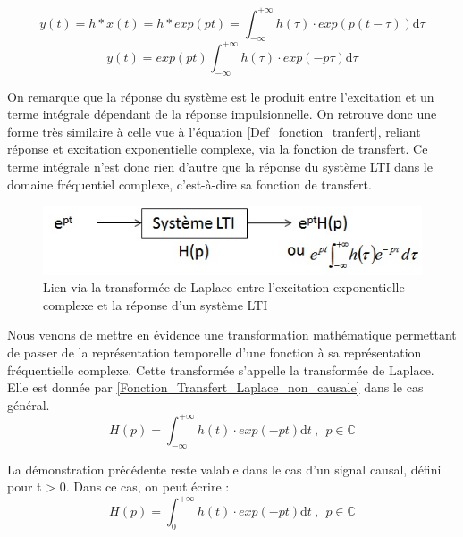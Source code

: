 \documentclass[]{report}
\newcommand{\deriv}{\mathrm{d}}
\begin{document}
	\begin{equation}\label{}
	y(t) = h*x(t) = h * exp(pt) = \int_{-\infty}^{+\infty} h(\tau) \cdot exp(p(t-\tau))
 \deriv \tau 	
 	\end{equation}
	\begin{equation}\label{Demo_Laplace}
	y(t) = exp(pt) \int_{-\infty}^{+\infty} h(\tau) \cdot exp(-p\tau)
	\deriv \tau 	
	\end{equation}
	
	On remarque que la réponse du système est le produit entre l'excitation et un terme intégrale dépendant de la réponse impulsionnelle. On retrouve donc une forme très similaire à celle vue à l'équation \ref{Def_fonction_tranfert}, reliant réponse et excitation exponentielle complexe, via la fonction de transfert. Ce terme intégrale n'est donc rien d'autre que la réponse du système LTI dans le domaine fréquentiel complexe, c'est-à-dire sa fonction de transfert.
	\begin{figure}[h!]
		\centering
		\includegraphics[scale=0.7]{images/LTI_Laplace.jpg}
		\caption{Lien via la transformée de Laplace entre l'excitation exponentielle complexe et la réponse d'un système LTI}	
		\label{Fig:LTI_Laplace} 
	\end{figure}
	
	Nous venons de mettre en évidence une transformation mathématique permettant de passer de la représentation temporelle d'une fonction à sa représentation fréquentielle complexe. Cette transformée s'appelle la transformée de Laplace. Elle est donnée par \ref{Fonction_Transfert_Laplace_non_causale} dans le cas général.
	\begin{equation}\label{Fonction_Transfert_Laplace_non_causale}
	H(p) = \int_{-\infty}^{+\infty} h(t) \cdot exp(-pt)	\deriv t~,~~p \in \mathbb{C}	
	\end{equation}	
	
	La démonstration précédente reste valable dans le cas d'un signal causal, défini pour t > 0. Dans ce cas, on peut écrire :
	\begin{equation}\label{Fonction_Transfert_Laplace_causale}
	H(p) = \int_{0}^{+\infty} h(t) \cdot exp(-pt)	\deriv t~,~~p \in \mathbb{C}	
	\end{equation}
	
\end{document}

